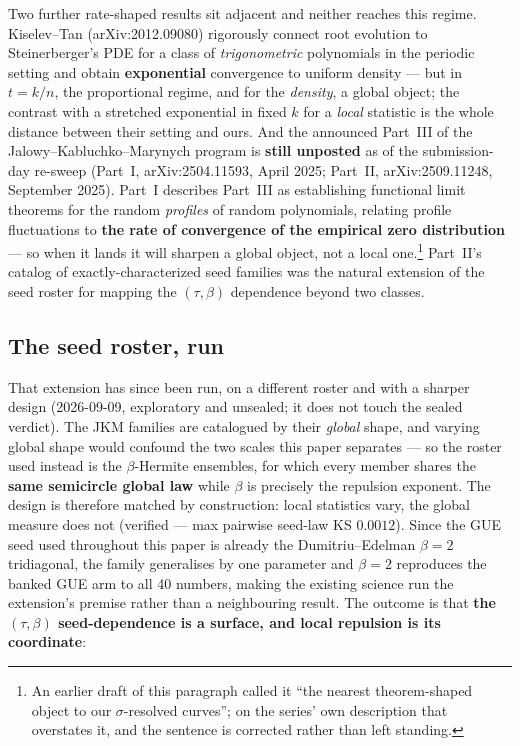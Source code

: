 \documentclass[11pt]{article}
\begin{document}
Two further rate-shaped results sit adjacent and neither reaches this regime. Kiselev--Tan
(arXiv:2012.09080) rigorously connect root evolution to Steinerberger's PDE for a class of
\emph{trigonometric} polynomials in the periodic setting and obtain \textbf{exponential}
convergence to uniform density --- but in $t=k/n$, the proportional regime, and for the
\emph{density}, a global object; the contrast with a stretched exponential in fixed $k$ for a
\emph{local} statistic is the whole distance between their setting and ours. And the announced
Part~III of the Jalowy--Kabluchko--Marynych program is \textbf{still unposted} as of the
submission-day re-sweep (Part~I, arXiv:2504.11593, April 2025; Part~II, arXiv:2509.11248,
September 2025). Part~I describes Part~III as establishing functional limit theorems for the
random \emph{profiles} of random polynomials, relating profile fluctuations to \textbf{the rate
of convergence of the empirical zero distribution} --- so when it lands it will sharpen a global
object, not a local one.\footnote{An earlier draft of this paragraph called it ``the nearest
theorem-shaped object to our $\sigma$-resolved curves''; on the series' own description that
overstates it, and the sentence is corrected rather than left standing.} Part~II's catalog of
exactly-characterized seed families was the natural extension of the seed roster for mapping the
$(\tau,\beta)$ dependence beyond two classes.

\subsection*{The seed roster, run}

That extension has since been run, on a different roster and with a sharper design (2026-09-09,
exploratory and unsealed; it does not touch the sealed verdict). The JKM families are catalogued
by their \emph{global} shape, and varying global shape would confound the two scales this paper
separates --- so the roster used instead is the $\beta$-Hermite ensembles, for which every member
shares the \textbf{same semicircle global law} while $\beta$ is precisely the repulsion exponent.
The design is therefore matched by construction: local statistics vary, the global measure does
not (verified --- max pairwise seed-law KS $0.0012$). Since the GUE seed used throughout this
paper is already the Dumitriu--Edelman $\beta=2$ tridiagonal, the family generalises by one
parameter and $\beta=2$ reproduces the banked GUE arm to all 40 numbers, making the existing
science run the extension's premise rather than a neighbouring result. The outcome is that
\textbf{the $(\tau,\beta)$ seed-dependence is a surface, and local repulsion is its coordinate}:
\end{document}
